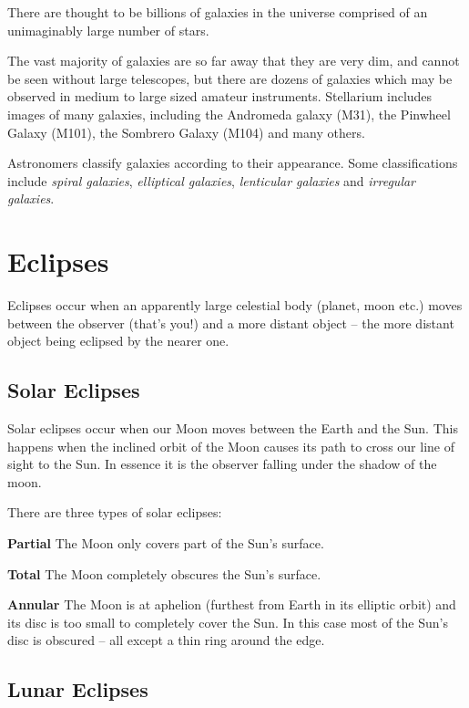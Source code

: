 There are thought to be billions of galaxies in the universe comprised
of an unimaginably large number of stars.

The vast majority of galaxies are so far away that they are very dim,
and cannot be seen without large telescopes, but there are dozens of
galaxies which may be observed in medium to large sized amateur
instruments. Stellarium includes images of many galaxies, including the
Andromeda galaxy (M31), the Pinwheel Galaxy (M101), the Sombrero Galaxy
(M104) and many others.

Astronomers classify galaxies according to their appearance. Some
classifications include \emph{spiral galaxies}, \emph{elliptical
galaxies}, \emph{lenticular galaxies} and \emph{irregular galaxies}.



\section{Eclipses}
\label{sec:Eclipses}

Eclipses occur when an apparently large celestial body (planet, moon
etc.) moves between the observer (that's you!) and a more distant object
-- the more distant object being eclipsed by the nearer one.

\subsection{Solar Eclipses}
\label{sec:Eclipses:solar}

Solar eclipses occur when our Moon moves between the Earth and the Sun.
This happens when the inclined orbit of the Moon causes its path to
cross our line of sight to the Sun. In essence it is the observer
falling under the shadow of the moon.

There are three types of solar eclipses:

\textbf{Partial} The Moon only covers part of the Sun's surface.

\textbf{Total} The Moon completely obscures the Sun's surface.

\textbf{Annular} The Moon is at aphelion (furthest from Earth in its
elliptic orbit) and its disc is too small to completely cover the Sun.
In this case most of the Sun's disc is obscured -- all except a thin ring
around the edge.

\subsection{Lunar Eclipses}
\label{sec:Eclipses:lunar}

